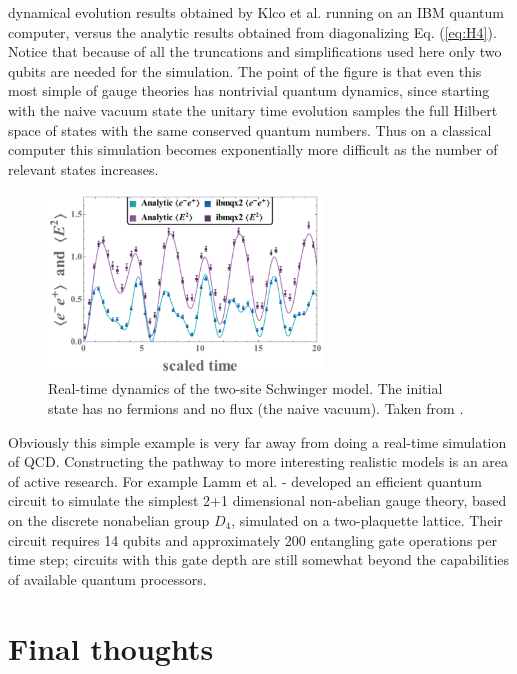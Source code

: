 \documentclass[a4paper,11pt]{article}
\begin{document}
dynamical evolution results
obtained by Klco et al. \cite{Klco:2018kyo} running on an IBM quantum computer, versus the analytic results obtained from diagonalizing
Eq. (\ref{eq:H4}). Notice that because of all the truncations and simplifications used here only two qubits are needed for the simulation.
The point of the figure is that even this most simple of gauge theories has nontrivial quantum dynamics, since starting with the naive vacuum
state the unitary time evolution samples the full Hilbert space of states with the same conserved quantum numbers. Thus on a classical computer
this simulation becomes exponentially more difficult as the number of relevant states increases.


%
\begin{figure}[tb]
\centering
\includegraphics[width=0.65\textwidth]{figs/1p1Even_pairsE2_extrapolated.png}
\caption{Real-time dynamics of the two-site Schwinger model. The initial state has no fermions and no flux (the naive vacuum).
Taken from \cite{Klco:2018kyo}.  \label{fig:SchwingerSim}}
\end{figure}
%

Obviously this simple example is very far away from doing a real-time simulation of QCD. Constructing the pathway to more interesting realistic
models is an area of active research. For example Lamm et al. \cite{Lamm:2019bik}-\cite{Lamm:2019uyc} developed an efficient quantum circuit
to simulate the simplest 2+1 dimensional non-abelian gauge theory, based on the discrete nonabelian group $D_4$, simulated on a two-plaquette lattice.
Their circuit requires 14 qubits and approximately 200 entangling gate operations per time step; circuits with this gate depth are still somewhat beyond
the capabilities of available quantum processors.



\section{Final thoughts}
\end{document}
